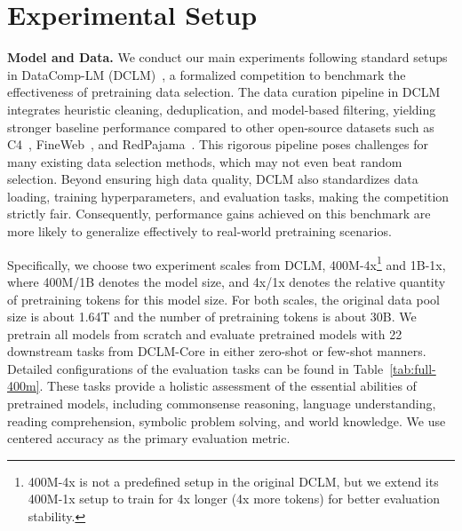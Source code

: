 \section{Experimental Setup}

\textbf{Model and Data.} We conduct our main experiments following standard setups in DataComp-LM (DCLM)~\cite{li2024datacomp}, a formalized competition to benchmark the effectiveness of pretraining data selection. 
The data curation pipeline in DCLM integrates heuristic cleaning, deduplication, and model-based filtering, yielding stronger baseline performance compared to other open-source datasets such as C4~\cite{t5}, FineWeb~\cite{penedo2024fineweb}, and RedPajama~\cite{weber2024redpajama}. This rigorous pipeline poses challenges for many existing data selection methods, which may not even beat random selection. Beyond ensuring high data quality, DCLM also standardizes data loading, training hyperparameters, and evaluation tasks, making the competition strictly fair. Consequently, performance gains achieved on this benchmark are more likely to generalize effectively to real-world pretraining scenarios.

Specifically, we choose two experiment scales from DCLM, 400M-4x\footnote{400M-4x is not a predefined setup in the original DCLM, but we extend its 400M-1x setup to train for 4x longer (4x more tokens) for better evaluation stability.} and 1B-1x, where 400M/1B denotes the model size, and 4x/1x denotes the relative quantity of pretraining tokens for this model size. For both scales, the original data pool size is about 1.64T and the number of pretraining tokens is about 30B. We pretrain all models from scratch and evaluate pretrained models with 22 downstream tasks from DCLM-Core in either zero-shot or few-shot manners. Detailed configurations of the evaluation tasks can be found in Table~\ref{tab:full-400m}.  These tasks provide a holistic assessment of the essential abilities of pretrained models, including commonsense reasoning, language understanding, reading comprehension, symbolic problem solving, and world knowledge. We use centered accuracy as the primary evaluation metric.

